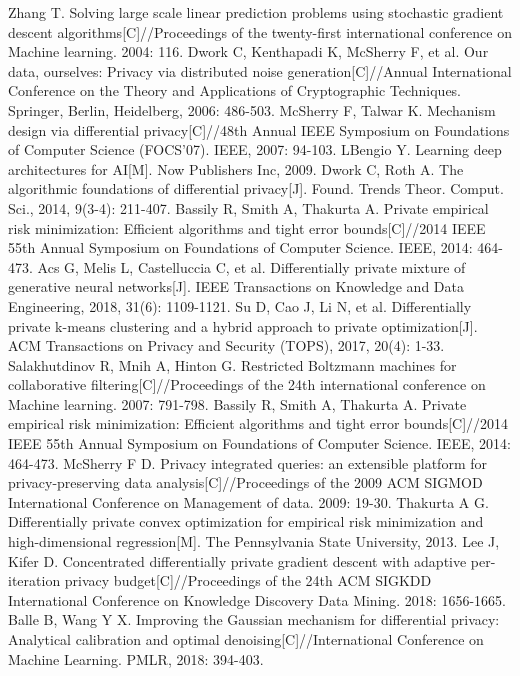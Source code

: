 \documentclass[12pt,openany,a4paper,fancyhdr,oneside]{ctexbook}
\begin{document}
\begin{thebibliography}{99}
Zhang T. Solving large scale linear prediction problems using stochastic gradient descent algorithms[C]//Proceedings of the twenty-first international conference on Machine learning. 2004: 116.
Dwork C, Kenthapadi K, McSherry F, et al. Our data, ourselves: Privacy via distributed noise generation[C]//Annual International Conference on the Theory and Applications of Cryptographic Techniques. Springer, Berlin, Heidelberg, 2006: 486-503.
McSherry F, Talwar K. Mechanism design via differential privacy[C]//48th Annual IEEE Symposium on Foundations of Computer Science (FOCS'07). IEEE, 2007: 94-103.
LBengio Y. Learning deep architectures for AI[M]. Now Publishers Inc, 2009.
Dwork C, Roth A. The algorithmic foundations of differential privacy[J]. Found. Trends Theor. Comput. Sci., 2014, 9(3-4): 211-407.
Bassily R, Smith A, Thakurta A. Private empirical risk minimization: Efficient algorithms and tight error bounds[C]//2014 IEEE 55th Annual Symposium on Foundations of Computer Science. IEEE, 2014: 464-473.
Acs G, Melis L, Castelluccia C, et al. Differentially private mixture of generative neural networks[J]. IEEE Transactions on Knowledge and Data Engineering, 2018, 31(6): 1109-1121.
Su D, Cao J, Li N, et al. Differentially private k-means clustering and a hybrid approach to private optimization[J]. ACM Transactions on Privacy and Security (TOPS), 2017, 20(4): 1-33.
Salakhutdinov R, Mnih A, Hinton G. Restricted Boltzmann machines for collaborative filtering[C]//Proceedings of the 24th international conference on Machine learning. 2007: 791-798.
Bassily R, Smith A, Thakurta A. Private empirical risk minimization: Efficient algorithms and tight error bounds[C]//2014 IEEE 55th Annual Symposium on Foundations of Computer Science. IEEE, 2014: 464-473.
McSherry F D. Privacy integrated queries: an extensible platform for privacy-preserving data analysis[C]//Proceedings of the 2009 ACM SIGMOD International Conference on Management of data. 2009: 19-30.
Thakurta A G. Differentially private convex optimization for empirical risk minimization and high-dimensional regression[M]. The Pennsylvania State University, 2013.
Lee J, Kifer D. Concentrated differentially private gradient descent with adaptive per-iteration privacy budget[C]//Proceedings of the 24th ACM SIGKDD International Conference on Knowledge Discovery Data Mining. 2018: 1656-1665.
Balle B, Wang Y X. Improving the Gaussian mechanism for differential privacy: Analytical calibration and optimal denoising[C]//International Conference on Machine Learning. PMLR, 2018: 394-403.

\end{thebibliography}
\end{document}
